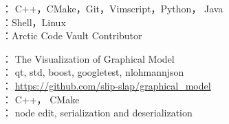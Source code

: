 

： C++，CMake，Git，Vimscript，Python， Java \\
：Shell，Linux\\
：Arctic Code Vault Contributor \\



：  The Visualization of Graphical Model\\
： qt, std, boost, googletest, nlohmannjson \\
： \url{https://github.com/slip-slap/graphical_model} \\
： C++， CMake \\
： node edit, serialization and deserialization\\








